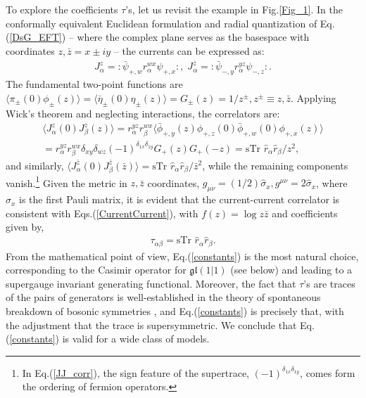 \documentclass[final,5p,10pt,times,twocolumn,year]{elsarticle}
\begin{document}
To explore the coefficients $\tau$'s, let us revisit the example in Fig.\ref{Fig_1}. In the conformally equivalent Euclidean formulation and radial quantization of Eq.(\ref{DsG_EFT}) -- where the complex plane serves as the basespace with coordinates $z,\bar z=x\pm iy$ -- the currents can be expressed as:
\begin{eqnarray}
J^{z}_\alpha = :\bar \psi_{+,w} r_\alpha^{wx}\psi_{+,x}:, \;  J^{\bar z}_\alpha = :\bar \psi_{-,y} r_\alpha^{yz}\psi_{-,z}:.
\end{eqnarray}
The fundamental two-point functions are $\langle \pi_{\pm} (0)\phi_{\pm}(z) \rangle=\langle \bar\eta_{\pm}(0) \eta_{\pm}(z) \rangle= G_\pm(z)=1/z^\pm, z^\pm \equiv z, \bar z$. Applying Wick's theorem and neglecting interactions, the correlators are:
\begin{eqnarray}
    \langle J^z_\alpha(0) J^{z}_\beta (z) \rangle = r_\alpha^{yz} r_\beta^{wx} \langle \bar \phi_{+,y}(z) \phi_{+,z}(0) \bar \phi_{+,w}(0) \phi_{+,x}(z) \rangle \nonumber\\=
    r_\alpha^{yz} r_\beta^{wx} \delta_{xy}\delta_{wz} (-1)^{\delta_{1x} \delta_{1y}} G_+(z)G_+(-z) = \text{sTr }\hat r_\alpha\hat r_\beta / z^2,\label{JJ_corr}
\end{eqnarray}
and similarly, $\langle J^{\bar z}_\alpha(0) J^{\bar z}_\beta (\bar z) \rangle = \text{sTr }\hat r_\alpha\hat r_\beta /\bar z^2$, while the remaining components vanish.\footnote{In Eq.(\ref{JJ_corr}), the sign feature of the supertrace, $(-1)^{\delta_{1x} \delta_{1y}}$, comes form the ordering of fermion operators.} Given the metric in $z,\bar z$ coordinates, $g_{\mu\nu} = (1/2)\hat \sigma_x, g^{\mu\nu} = 2\hat \sigma_x$, where $\sigma_x$ is the first Pauli matrix, it is evident that the current-current correlator is consistent with Eqs.(\ref{CurrentCurrent}), with $f(z)=\log z\bar z$ and coefficients given by,
\begin{eqnarray}
    \tau_{\alpha\beta} = \text{sTr }\hat r_\alpha \hat r_\beta. \label{constants}
\end{eqnarray}
From the mathematical point of view, Eq.(\ref{constants}) is the most natural choice, corresponding to the Casimir operator for $\mathfrak{gl}(1|1)$ (see below) and leading to a supergauge invariant generating functional. Moreover, the fact that $\tau$'s are traces of the pairs of generators is well-established in the theory of spontaneous breakdown of bosonic symmetries \cite{RFT_SSB_book}, and Eq.(\ref{constants}) is precisely that, with the adjustment that the trace is supersymmetric. We conclude that Eq.(\ref{constants}) is valid for a wide class of models. 
\end{document}
